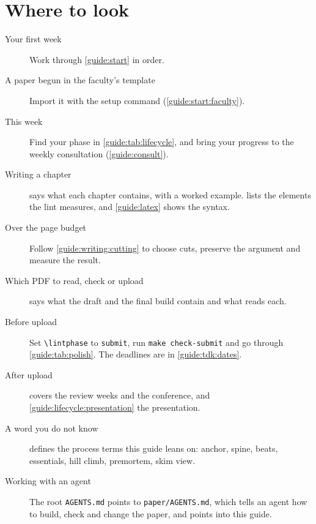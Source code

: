 \section{Where to look}\label{guide:here:route}
\begin{description}
  \item[Your first week] Work through \cref{guide:start} in order.
  \item[A paper begun in the faculty's template] Import it with the setup command (\cref{guide:start:faculty}).
  \item[This week] Find your phase in \cref{guide:tab:lifecycle}, and bring your progress to the weekly consultation (\cref{guide:consult}).
  \item[Writing a chapter]  says what each chapter contains, with a worked example.  lists the elements the lint measures, and \cref{guide:latex} shows the syntax.
  \item[Over the page budget] Follow \cref{guide:writing:cutting} to choose cuts, preserve the argument and measure the result.
  \item[Which PDF to read, check or upload]  says what the draft and the final build contain and what reads each.
  \item[Before upload] Set \texttt{\textbackslash lintphase} to \texttt{submit}, run \texttt{make check-submit} and go through \cref{guide:tab:polish}. The deadlines are in \cref{guide:tdk:dates}.
  \item[After upload]  covers the review weeks and the conference, and \cref{guide:lifecycle:presentation} the presentation.
  \item[A word you do not know]  defines the process terms this guide leans on: anchor, spine, beats, essentials, hill climb, premortem, skim view.
  \item[Working with an agent] The root \texttt{AGENTS.md} points to \texttt{paper/AGENTS.md}, which tells an agent how to build, check and change the paper, and points into this guide.
\end{description}
